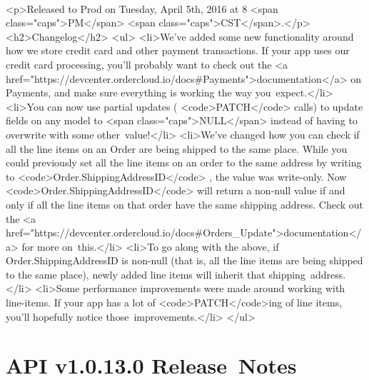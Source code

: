 \documentclass{memoir}%
\begin{document}
\paragraph*{}%
<p>Released to Prod on Tuesday, April 5th, 2016 at 8 <span class="caps">PM</span> <span class="caps">CST</span>.</p>\newline%
<h2>Changelog</h2>\newline%
<ul>\newline%
<li>We’ve added some new functionality around how we store credit card and other payment transactions. If your app uses our credit card processing, you’ll probably want to check out the <a href="https://devcenter.ordercloud.io/docs\#Payments">documentation</a> on Payments, and make sure everything is working the way you~expect.</li>\newline%
<li>You can now use partial updates ( <code>PATCH</code> calls) to update fields on any model to <span class="caps">NULL</span> instead of having to overwrite with some other~value!</li>\newline%
<li>We’ve changed how you can check if all the line items on an Order are being shipped to the same place. While you could previously set all the line items on an order to the same address by writing to <code>Order.ShippingAddressID</code> , the value was write{-}only. Now <code>Order.ShippingAddressID</code>  will return a non{-}null value if and only if all the line items on that order have the same shipping address. Check out the <a href="https://devcenter.ordercloud.io/docs\#Orders\_Update">documentation</a> for more on~this.</li>\newline%
<li>To go along with the above, if Order.ShippingAddressID is non{-}null (that is, all the line items are being shipped to the same place), newly added line items will inherit that shipping~address. </li>\newline%
<li>Some performance improvements were made around working with line{-}items. If your app has a lot of <code>PATCH</code>ing  of line items, you’ll hopefully notice those~improvements.</li>\newline%
</ul>

%
\section*{API v1.0.13.0 Release~Notes}%
\paragraph*{}%
\end{document}
